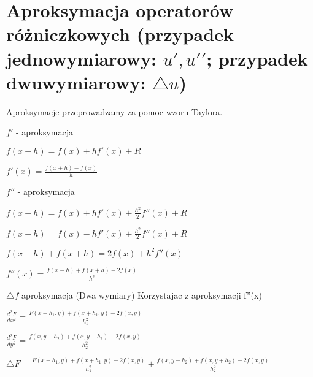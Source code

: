 \section{Aproksymacja operatorów różniczkowych (przypadek jednowymiarowy: ${u}', {{u}'}'$; przypadek dwuwymiarowy: $\bigtriangleup u$)}

Aproksymacje przeprowadzamy za pomoc wzoru Taylora. 

$f'$ - aproksymacja

$f(x+h) = f(x) + hf'(x) + R$

$f'(x) = \frac{f(x + h) - f(x)}{h}$

$f''$ - aproksymacja

$f(x+h) = f(x) + hf'(x) + \frac{h^2}{2}f''(x) + R$

$f(x-h) = f(x) - hf'(x) + \frac{h^2}{2}f''(x) + R$

$f(x-h) + f(x+h) = 2f(x) + h^2 f''(x)$

$f''(x) = \frac{f(x-h) + f(x+h) -2f(x)}{h^2} $

$\bigtriangleup f$ aproksymacja (Dwa wymiary)
Korzystajac z aproksymacji f''(x)

$\frac{d^2F}{dx^2} = \frac{F(x-h_1 , y) + f(x+h_1,y) -2f(x,y)}{h_1^2} $

$\frac{d^2F}{dy^2} = \frac{f(x , y-h_2) + f(x, y+h_2) -2f(x,y)}{h_2^2} $

$\bigtriangleup F = \frac{F(x-h_1 , y) + f(x+h_1,y) -2f(x,y)}{h_1^2} + \frac{f(x , y-h_2) + f(x, y+h_2) -2f(x,y)}{h_2^2}$